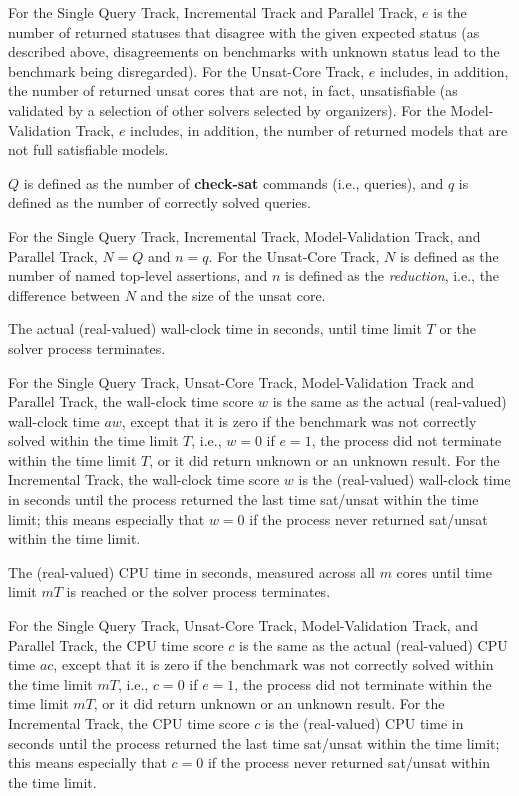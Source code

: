 \documentclass[12pt]{article}
\newcommand{\akey}[1]{\textbf{#1}\xspace}
\newcommand{\maintrack}{Single Query Track\xspace}
\newcommand{\inctrack}{Incremental Track\xspace}
\newcommand{\ucoretrack}{Unsat-Core Track\xspace}
\newcommand{\mvaltrack}{Model-Validation Track\xspace}
\newcommand{\paralleltrack}{Parallel Track\xspace}
\begin{document}
For the \maintrack, \inctrack and \paralleltrack,
$e$ is the number of returned
statuses that disagree with the given expected status (as described above,
disagreements on benchmarks with unknown status lead to the benchmark being
disregarded). For the \ucoretrack, $e$ includes, in addition, the number of
returned unsat cores that are not, in fact, unsatisfiable (as
validated by a selection of other solvers selected by organizers).  For the
\mvaltrack, $e$ includes, in addition, the number of returned models that are
not full satisfiable models.

$Q$ is defined as the number of \akey{check-sat} commands (i.e., queries), and
$q$ is defined as the number of correctly solved queries.

For the \maintrack, \inctrack, \mvaltrack, and \paralleltrack,
$N = Q$ and $n = q$.
For the \ucoretrack, $N$ is defined as the number of named top-level assertions,
and $n$ is defined as the \emph{reduction}, i.e., the difference between $N$
and the size of the unsat core.

The actual (real-valued) wall-clock time in seconds, until time limit $T$ or the
solver process terminates.

For the \maintrack, \ucoretrack, \mvaltrack and \paralleltrack,
the wall-clock time score $w$ is the same as
the actual (real-valued) wall-clock time $\mathit{aw}$,
except that it is zero if the benchmark was not correctly solved within the time limit $T$, i.e.,
$w = 0$ if $e = 1$, the process did not terminate within the time limit $T$, or
it did return unknown or an unknown result.
For the \inctrack, the wall-clock time score $w$
is the (real-valued) wall-clock time in seconds until the process returned the last time sat/unsat within the time limit;
this means especially that $w = 0$ if the process never returned sat/unsat within the time limit.

The (real-valued) CPU time in seconds, measured across all $m$ cores
until time limit $mT$ is reached or the solver process
terminates.

For the \maintrack, \ucoretrack, \mvaltrack, and \paralleltrack,
the CPU time score $c$ is the same as
the actual (real-valued) CPU time $\mathit{ac}$,
except that it is zero if the benchmark was not correctly solved within the time limit $mT$, i.e.,
$c = 0$ if $e = 1$, the process did not terminate within the time limit $mT$, or
it did return unknown or an unknown result.
For the \inctrack, the CPU time score $c$
is the (real-valued) CPU time in seconds until the process returned the last time sat/unsat within the time limit;
this means especially that $c = 0$ if the process never returned sat/unsat within the time limit.
\end{document}
